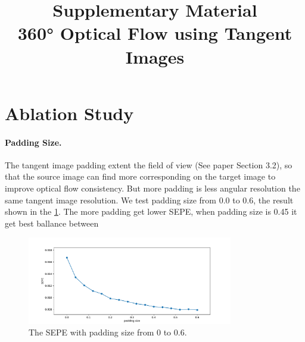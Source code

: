 \documentclass{bmvc2k}
\title{Supplementary Material \\
360\!° Optical Flow using Tangent Images}
\newcommand{\TODO}[1]{\textcolor{red}{{[TODO: #1]}}}
\begin{document}
\maketitle

%
%


%
%


\section{Ablation Study}
\label{sec:sup:ablations}


\paragraph{Padding Size.}

The tangent image padding extent the field of view  (See paper Section 3.2), so that the source image can find more corresponding on the target image to improve optical flow consistency.
But more padding is less angular resolution the same tangent image resolution.
%
We test padding size from 0.0 to 0.6, the result shown in the \cref{fig:sup:ablationpadding}.
The more padding get lower SEPE, when padding size is 0.45 it get best ballance between 


\begin{figure}[hbt!]
	\centering
	\includegraphics[width=0.80\textwidth]{images/abla_padding.pdf}
	\caption{\label{fig:sup:ablationpadding}%
		The SEPE with padding size from 0 to 0.6.}
\end{figure}
\end{document}
